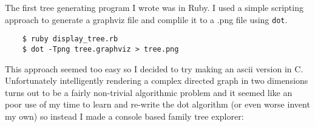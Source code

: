 \documentclass[11pt]{article}
\begin{document}
   
   The first tree generating program I wrote was in Ruby.  I used a
   simple scripting approach to generate a graphviz file and complile
   it to a .png file using \verb|dot|.
   
\begin{verbatim}
    $ ruby display_tree.rb
    $ dot -Tpng tree.graphviz > tree.png
\end{verbatim}

   
   This approach seemed too easy so I decided to try making an ascii
   version in C.  Unfortunately intelligently rendering a complex
   directed graph in two dimensions turns out to be a fairly
   non-trivial algorithmic problem and it seemed like an poor use of
   my time to learn and re-write the dot algorithm (or even worse
   invent my own) so instead I made a console based family tree
   explorer:
   
\end{document}
